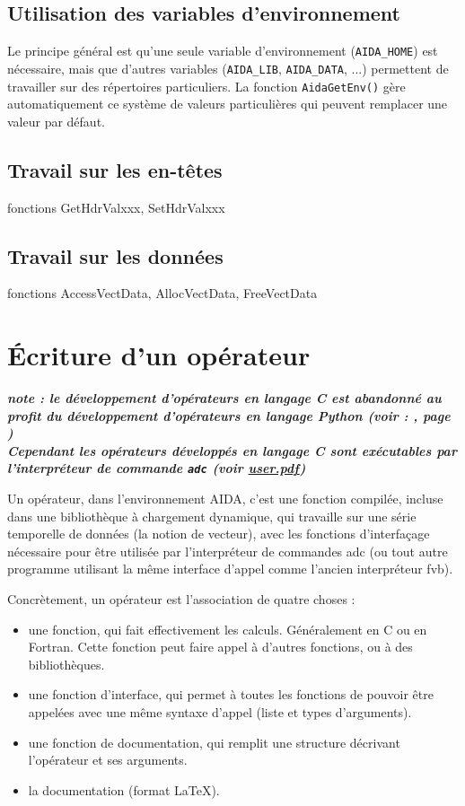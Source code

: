 \subsection{Utilisation des variables d'environnement}
         Le principe général est qu'une seule variable 
d'environnement (\texttt{AIDA\_HOME}) est nécessaire, mais
que d'autres variables (\texttt{AIDA\_LIB},  \texttt{AIDA\_DATA}, ...)
permettent de travailler sur des répertoires particuliers. La fonction
\texttt{AidaGetEnv()} gère automatiquement ce système
de valeurs particulières qui peuvent remplacer une valeur
par défaut.

\subsection{Travail sur les en-têtes}
            fonctions GetHdrValxxx, SetHdrValxxx

\subsection{Travail sur les données}
            fonctions AccessVectData, AllocVectData, FreeVectData

\section{Écriture d'un opérateur}
\label{sec:ecr_oper}

\textbf{\textit{note : le développement d'opérateurs en langage C est
abandonné au profit du développement d'opérateurs en langage Python (voir :
, page \pageref{sec:adc_oper}) \\
Cependant les opérateurs développés en langage C sont exécutables par
l'interpréteur de commande \texttt{adc} (voir \url{user.pdf})}}
\bigbreak

   Un opérateur, dans l'environnement AIDA, c'est une fonction
compilée, incluse dans une bibliothèque à chargement dynamique, qui travaille
sur une série temporelle de données (la notion de vecteur), avec les
fonctions d'interfaçage nécessaire pour être utilisée par l'interpréteur
de commandes adc 
(ou tout autre programme utilisant la même interface d'appel comme l'ancien
interpréteur fvb).

Concrètement, un opérateur est l'association de quatre choses :
\begin{itemize}
  \item une fonction, qui fait effectivement les calculs. Généralement en
    C ou en Fortran. Cette fonction peut faire appel à d'autres fonctions, ou
    à des bibliothèques.
  \item une fonction d'interface, qui permet à toutes les fonctions
    de pouvoir être appelées avec une même syntaxe d'appel (liste et types
    d'arguments).
  \item une fonction de documentation, qui remplit une structure décrivant
    l'opérateur et ses arguments.
  \item la documentation (format \LaTeX ).
\end{itemize}

